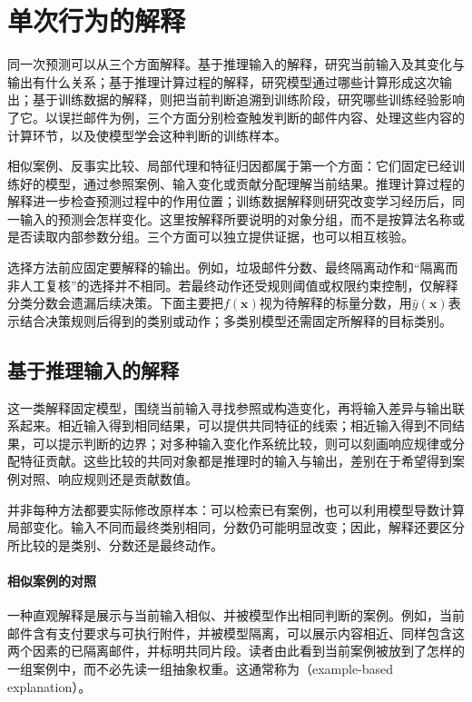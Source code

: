 \section{单次行为的解释}
\label{sec:interpretability-local}

同一次预测可以从三个方面解释。基于推理输入的解释，研究当前输入及其变化与输出有什么关系；基于推理计算过程的解释，研究模型通过哪些计算形成这次输出；基于训练数据的解释，则把当前判断追溯到训练阶段，研究哪些训练经验影响了它。以误拦邮件为例，三个方面分别检查触发判断的邮件内容、处理这些内容的计算环节，以及使模型学会这种判断的训练样本。

相似案例、反事实比较、局部代理和特征归因都属于第一个方面：它们固定已经训练好的模型，通过参照案例、输入变化或贡献分配理解当前结果。推理计算过程的解释进一步检查预测过程中的作用位置；训练数据解释则研究改变学习经历后，同一输入的预测会怎样变化。这里按解释所要说明的对象分组，而不是按算法名称或是否读取内部参数分组。三个方面可以独立提供证据，也可以相互核验。

选择方法前应固定要解释的输出。例如，垃圾邮件分数、最终隔离动作和“隔离而非人工复核”的选择并不相同。若最终动作还受规则阈值或权限约束控制，仅解释分类分数会遗漏后续决策。下面主要把$f(\bm{x})$视为待解释的标量分数，用$\hat y(\bm{x})$表示结合决策规则后得到的类别或动作；多类别模型还需固定所解释的目标类别。

\subsection{基于推理输入的解释}
\label{sec:interpretability-local-input}

这一类解释固定模型，围绕当前输入寻找参照或构造变化，再将输入差异与输出联系起来。相近输入得到相同结果，可以提供共同特征的线索；相近输入得到不同结果，可以提示判断的边界；对多种输入变化作系统比较，则可以刻画响应规律或分配特征贡献。这些比较的共同对象都是推理时的输入与输出，差别在于希望得到案例对照、响应规则还是贡献数值。

并非每种方法都要实际修改原样本：可以检索已有案例，也可以利用模型导数计算局部变化。输入不同而最终类别相同，分数仍可能明显改变；因此，解释还要区分所比较的是类别、分数还是最终动作。

\paragraph{相似案例的对照}
\label{sec:interpretability-local-examples}

一种直观解释是展示与当前输入相似、并被模型作出相同判断的案例。例如，当前邮件含有支付要求与可执行附件，并被模型隔离，可以展示内容相近、同样包含这两个因素的已隔离邮件，并标明共同片段。读者由此看到当前案例被放到了怎样的一组案例中，而不必先读一组抽象权重。这通常称为（example-based explanation）。

